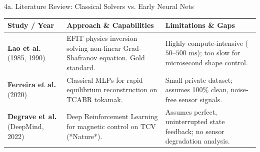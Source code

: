 \documentclass[aspectratio=169, 10pt]{beamer}
\begin{document}
\begin{frame}{4a. Literature Review: Classical Solvers vs. Early Neural Nets}
  \vspace{-2pt}
  \begin{table}[h]
    \centering
    \small
    \renewcommand{\arraystretch}{1.2}
    \begin{tabular}{P{3.0cm} P{5.1cm} P{5.1cm}}
      \toprule
      \textbf{Study / Year} & \textbf{Approach \& Capabilities} & \textbf{Limitations \& Gaps} \\
      \midrule
      \textbf{Lao et al.} (1985, 1990) & EFIT physics inversion solving non-linear Grad-Shafranov equation. Gold standard. & Highly compute-intensive ($50\text{--}500\text{ ms}$); too slow for microsecond shape control. \\
      \addlinespace[6pt]
      \textbf{Ferreira et al.} (2020) & Classical MLPs for rapid equilibrium reconstruction on TCABR tokamak. & Small private dataset; assumes 100\% clean, noise-free sensor signals. \\
      \addlinespace[6pt]
      \textbf{Degrave et al.} (DeepMind, 2022) & Deep Reinforcement Learning for magnetic control on TCV (*Nature*). & Assumes perfect, uninterrupted state feedback; no sensor degradation analysis. \\
      \bottomrule
    \end{tabular}
  \end{table}
\end{frame}
\end{document}
